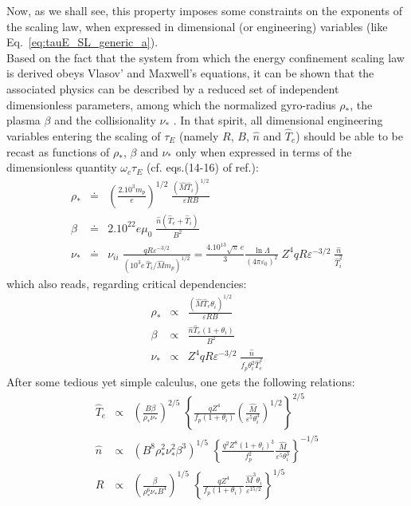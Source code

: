 Now, as we shall see, this property imposes some constraints on the exponents of the scaling law, when expressed in dimensional (or engineering) variables (like Eq.~\ref{eq:tauE_SL_generic_a}). \\

Based on the fact that the system from which the energy confinement scaling law is derived obeys Vlasov' and Maxwell's equations, it can be shown that the associated physics can be described by a reduced set of independent dimensionless parameters, among which the normalized gyro-radius $\rho_*$, the plasma $\beta$ and the collisionality $\nu_*$ . In that spirit, all dimensional engineering variables entering the scaling of $\tau_E$ (namely $R$, $B$, $\hat n$ and $\hat T_e$) should be able to be recast as functions of $\rho_*$, $\beta$ and $\nu_*$ only when expressed in terms of the dimensionless quantity $\omega_c \tau_E$ (cf. eqs.(14-16) of ref.\cite{ITERphysics_chap2}):
\begin{eqnarray}
  \rho_*  &\doteq& \left( \frac{2.10^3 m_p}{e} \right)^{1/2}\; \frac{(\hat M \hat T_i)^{1/2}}{\varepsilon R B} \\
  \beta   &\doteq& 2.10^{22}e\mu_0\; \frac{\hat n(\hat T_e+\hat T_i)}{B^2} \\
  \nu_*   &\doteq& \nu_{ii}\; \frac{qR \varepsilon^{-3/2}}{(10^3e\, \hat T_i/\hat M m_p)^{1/2}}
   = \frac{4.10^{13}\sqrt{\pi}\,e}{3} \frac{\ln\Lambda}{(4\pi\varepsilon_0)^2}\; 
     Z^4 qR \varepsilon^{-3/2}\; \frac{\hat n}{\hat T_i^2}
\end{eqnarray}
which also reads, regarding critical dependencies:
\begin{eqnarray}
\rho_*  &\propto& \frac{(\hat M \hat T_e \theta_i)^{1/2}}{\varepsilon R B} \\
\beta   &\propto& \frac{\hat n\hat T_e(1+\theta_i)}{B^2} \\
\nu_*   &\propto& Z^4 qR \varepsilon^{-3/2}\; \frac{\hat n}{f_p \theta_i^2\hat T_e^2}
\end{eqnarray}
After some tedious yet simple calculus, one gets the following relations:
\begin{eqnarray}
\hat T_e &\propto& \left( \frac{B\beta}{\rho_*\nu_*} \right)^{2/5} \; 
 \left\{ \frac{qZ^4}{f_p(1+\theta_i)} \left(\frac{\hat M}{\varepsilon^5\theta_i^3}\right)^{1/2} \right\}^{2/5} \\
\hat n   &\propto& \left( B^8\rho_*^2\nu_*^2\beta^3 \right)^{1/5} \;
 \left\{ \frac{q^2Z^8(1+\theta_i)^3}{f_p^2} \frac{\hat M}{\varepsilon^5\theta_i^3} \right\}^{-1/5}\\
R        &\propto& \left( \frac{\beta}{\rho_*^6\nu_*B^4} \right)^{1/5}\;
\left\{ \frac{qZ^4}{f_p(1+\theta_i)} \frac{\hat M^3\theta_i}{\varepsilon^{15/2}} \right\}^{1/5}
\end{eqnarray}
